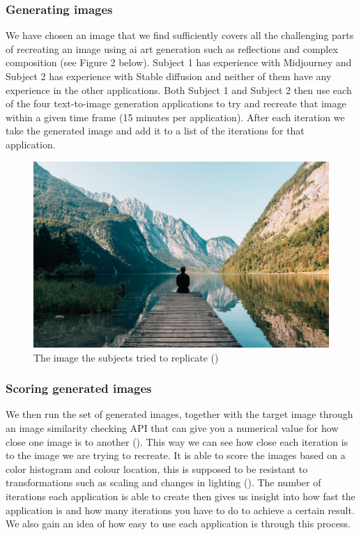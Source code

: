 \documentclass[]{report}
\begin{document}
	
	\subsubsection{Generating images}
	
	We have chosen an image that we find sufficiently covers all the challenging parts of recreating an image using ai art generation such as reflections and complex composition (see Figure 2 below).
	Subject 1 has experience with Midjourney and Subject 2 has experience with Stable diffusion and neither of them have any experience in the other applications. Both Subject 1 and Subject 2 then use each of the four text-to-image generation applications to try and recreate that image within a given time frame (15 minutes per application). After each iteration we take the generated image and add it to a list of the iterations for that application. 
	
	\begin{figure}[!h]
		\centering
		\includegraphics[width=1\linewidth]{OG}
		\caption{The image the subjects tried to replicate (\cite{targetImage})}
		\label{fig:og}
	\end{figure}
	
	\subsubsection{Scoring generated images}
	We then run the set of generated images, together with the target image through an image similarity checking API that can give you a numerical value for how close one image is to another (\cite{imageSimilarity}). This way we can see how close each iteration is to the image we are trying to recreate. It is able to score the images based on a color histogram and colour location, this is supposed to be resistant to transformations such as scaling and changes in lighting (\cite{imageSimilarityPaper}). The number of iterations each application is able to create then gives us insight into how fast the application is and how many iterations you have to do to achieve a certain result. We also gain an idea of how easy to use each application is through this process.
	
\end{document}

